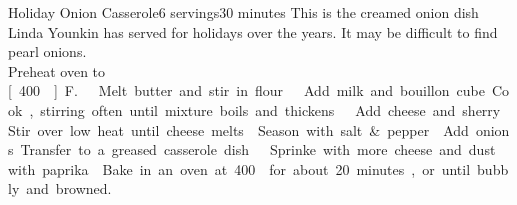 \begin{recipe}{Holiday Onion Casserole}{6 servings}{30 minutes}
\freeform This is the creamed onion dish Linda Younkin has served for holidays over the years.  It may be difficult to find pearl onions.\\
\newstep Preheat oven to \unit[400\0]{F.}
Melt butter and stir in flour.
Add milk and bouillon cube.  Cook, stirring often until mixture boils and thickens.
Add cheese and sherry.  Stir over low heat until cheese melts.
Season with salt \& pepper.
Add onions.  Transfer to a greased casserole dish.
Sprinke with more cheese and dust with paprika.
\newstep
Bake in an oven at 400\0 for about 20 minutes, or until bubbly and browned.
\end{recipe}
